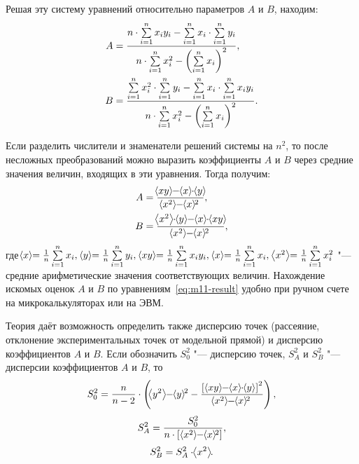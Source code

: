 \documentclass[a4paper, 12pt]{extarticle}
\newcommand{\isum}{\sum\limits_{i=1}^{n}}
\begin{document}
Решая эту систему уравнений относительно параметров $A$ и $B$, находим:
\begin{equation}
\label{eq:m11-solution}
\aligned
A &= \frac{n \cdot \isum x_i y_i - \isum x_i \cdot \isum y_i}{n \cdot \isum x_i^2 - \left( \isum x_i \right)^2}, \\
B &= \frac{\isum x_i^2 \cdot \isum y_i - \isum x_i \cdot \isum x_i y_i}{n \cdot \isum x_i^2 - \left( \isum x_i \right)^2}. %
\endaligned
\end{equation}

Если разделить числители и знаменатели решений системы на $n^2$, то после несложных преобразований можно выразить коэффициенты $A$ и $B$ через средние значения величин, входящих в эти уравнения. Тогда получим: %
\begin{equation}
\label{eq:m11-result}
\aligned
A &= \frac{\MTDMean{x  y} - \MTDMean{x} \cdot \MTDMean{y}}{\MTDMean{x^2} - \MTDMean{x}^2}, \\
B &= \frac{\MTDMean{x^2} \cdot \MTDMean{y} - \MTDMean{x} \cdot \MTDMean{x  y}}{\MTDMean{x^2} - \MTDMean{x}^2},
\endaligned
\end{equation}
где
$
\MTDMean{x} = \frac{1}{n} \isum x_i, \ \MTDMean{y} = \frac{1}{n} \isum y_i, \ \MTDMean{x  y} = \frac{1}{n} \isum x_i y_i, \ \MTDMean{x} = \frac{1}{n} \isum x_i,\ \MTDMean{x^2} = \frac{1}{n}  \isum x_i^2
$
"--- средние арифметические значения соответствующих величин. Нахождение искомых оценок $A$ и $B$ по уравнениям~\eqref{eq:m11-result} удобно при ручном счете на микрокалькуляторах или на ЭВМ.

\pagebreak

Теория даёт возможность определить также дисперсию точек (рассеяние, отклонение экспериментальных точек от модельной прямой) и дисперсию коэффициентов $A$ и $B$. Если обозначить $S_0^2$ "--- дисперсию точек, $S_A^2$  и $S_B^2$  "--- дисперсии коэффициентов $A$ и $B$, то
\begin{equation}
\label{eq:m11-S_0^2} %
S_0^2 = \frac{n}{n - 2} \cdot \left( \MTDMean{y^2} - \MTDMean{y}^2 - \frac{\left[ \hspace{3pt} \MTDMean{x y} - \MTDMean{x} \cdot \MTDMean{y} \hspace{3pt} \right] ^2}{\MTDMean{x^2} - \MTDMean{x}^2} \right), %
\end{equation}
\begin{equation}
\label{eq:m11-S_A^2}
S_A^2 =\frac{S_0^2}{n \cdot \left[ \hspace{3pt} \MTDMean{x^2} - \MTDMean{x}^2 \right]},
\end{equation}
\begin{equation}
\label{eq:m11-S_B^2}
S_B^2 = S_A^2 \cdot \hspace{-3pt}\left<x^2\right>\hspace{-3pt}.
\end{equation}
\end{document}
